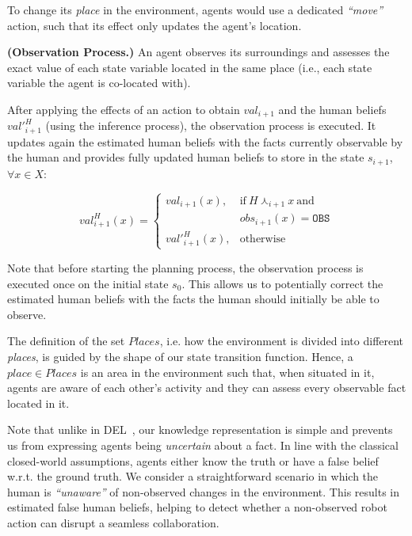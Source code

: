 {To change its \textit{place} in the environment, agents would use a dedicated \textit{``move''} action, such that its effect only updates the agent's location. 

\begin{definition} 
\label{def:new_obs}
    \textbf{(Observation Process.)} An agent observes its surroundings and assesses the exact value of each state variable located in the same place (i.e., each state variable the agent is co-located with).
\end{definition}

After applying the effects of an action to obtain $val_{i+1}$ and the human beliefs $val'^H_{i+1}$ (using the inference process), the observation process is executed. It updates again the estimated human beliefs with the facts currently observable by the human and provides fully updated human beliefs to store in the state $s_{i+1}$, $\forall x \in X$:

\begin{equation}
val^H_{i+1}(x) = \left\{ 
\begin{array}{ll}
val_{i+1}(x), & \mbox{if}~ H \curlywedge_{i+1} x ~\mbox{and}~ \\
    & obs_{i+1}(x) = \texttt{OBS}\\
val'^H_{i+1}(x), & \mbox{otherwise}
\end{array}\right.
\end{equation}

Note that before starting the planning process, the observation process is executed once on the initial state $s_0$. This allows us to potentially correct the estimated human beliefs with the facts the human should initially be able to observe. 

The definition of the set $Places$, i.e. how the environment is divided into different \textit{places}, is guided by the shape of our state transition function. Hence, a $place \in Places$ is an area in the environment such that, when situated in it, agents are aware of each other's activity and they can assess every observable fact located in it. 

Note that unlike in DEL~\cite{KR2021-12}, our knowledge representation is simple and prevents us from expressing agents being \textit{uncertain} about a fact. 
In line with the classical closed-world assumptions, agents either know the truth or have a false belief w.r.t. the ground truth. 
We consider a straightforward scenario in which the human is \textit{``unaware''} of non-observed changes in the environment. 
This results in estimated false human beliefs, helping to detect whether a non-observed robot action can disrupt a seamless collaboration. 

}
